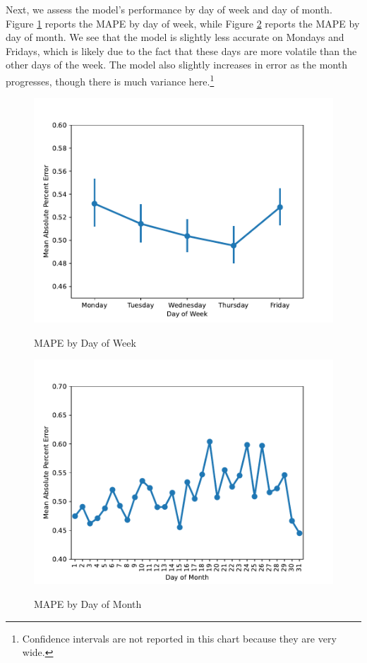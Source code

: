 \documentclass[12pt]{article}
\begin{document}
Next, we assess the model's performance by day of week and day of month. Figure \ref{fig:mape_by_day_of_week} reports the MAPE by day of week, while Figure \ref{fig:mape_by_day_of_month} reports the MAPE by day of month. We see that the model is slightly less accurate on Mondays and Fridays, which is likely due to the fact that these days are more volatile than the other days of the week. The model also slightly increases in error as the month progresses, though there is much variance here.\footnote{Confidence intervals are not reported in this chart because they are very wide.}
\begin{figure}[H]
    \centering
    \caption{MAPE by Day of Week}
    \includegraphics[width=0.6\linewidth]{../Output/mape_by_day_of_week.pdf}
    \label{fig:mape_by_day_of_week}
\end{figure}

\begin{figure}[H]
    \centering
    \caption{MAPE by Day of Month}
    \includegraphics[width=0.6\linewidth]{../Output/mape_by_day_of_month.pdf}
    \label{fig:mape_by_day_of_month}
\end{figure}
\end{document}
